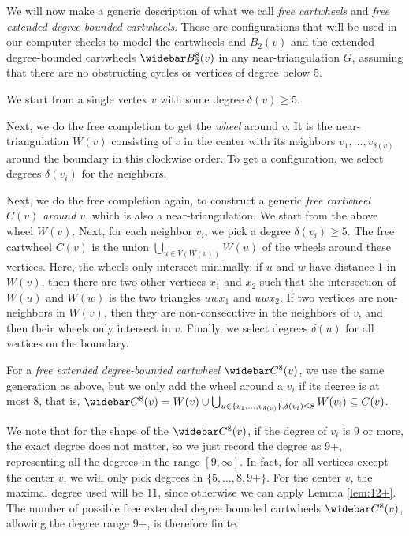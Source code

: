 \documentclass[10pt,a4paper]{article}
\renewcommand{\bar}{\widebar}
\begin{document}
We will now make a generic description of what we call \emph{free cartwheels} and \emph{free extended degree-bounded cartwheels}. These are configurations that will be used in our computer checks to model the cartwheels and $B_2(v)$ and the extended degree-bounded cartwheels $\bar B^8_2(v)$ in any near-triangulation $G$, assuming that there are no obstructing cycles or vertices of degree below 5.

We start from a single vertex $v$
with some degree $\delta(v)\geq 5$.

Next, we do the free completion to get
the \emph{wheel} around $v$. It is the near-triangulation $W(v)$ consisting of $v$ in the center with its neighbors $v_1,\ldots,v_{\delta(v)}$ around
the boundary in this clockwise order.
To get a configuration, we select degrees $\delta(v_i)$ for the neighbors.

Next, we do the free completion again, to construct a generic \emph{free cartwheel $C(v)$ around $v$}, which is also a near-triangulation. We
start from the above wheel $W(v)$. Next, for each neighbor $v_i$, we pick
a degree $\delta(v_i)\geq 5$. The free cartwheel $C(v)$ is the union $\bigcup_{u\in V(W(v))}W(u)$ of the wheels around these vertices. Here, the wheels only intersect minimally: if $u$ and $w$ have distance 1 in $W(v)$, then there are two other vertices $x_1$ and $x_2$ such that
the intersection of $W(u)$ and $W(w)$ is the two triangles $uwx_1$ and $uwx_2$. If two vertices are non-neighbors in $W(v)$, then they are non-consecutive in the neighbors of $v$, and then their wheels only intersect in $v$. Finally, we select degrees $\delta(u)$ for all vertices on the boundary.



For a \emph{free extended degree-bounded cartwheel} $\bar C^8(v)$, we use the same generation
as above, but we only add the 
wheel around a $v_i$ if its degree is at most 8, that is, $\bar C^8(v)=W(v)\cup \bigcup_{u\in \{v_1,\ldots,v_{\delta(v)}\}, \delta(v_i)\leq 8}W(v_i)\subseteq C(v)$.

We note that for the shape of the $\bar C^8(v)$, if the degree of $v_i$ is 9 or more, the exact degree does not matter, so we just record the degree as 9+, representing all the degrees in the range $[9,\infty]$. In fact, for all vertices except the center $v$, we will only pick degrees in $\{5,\ldots,8,9+\}$. 
For the center $v$, the maximal degree used will be $11$, since otherwise we can apply Lemma \ref{lem:12+}. The number of possible free extended degree bounded cartwheels $\bar C^8(v)$, allowing the degree range 9+, is therefore finite.
\end{document}
